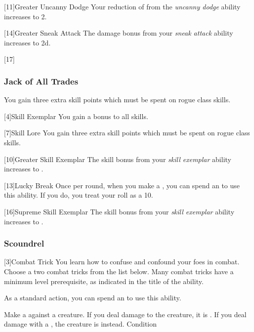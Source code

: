             [11]{Greater Uncanny Dodge}
            Your reduction of  from the \textit{uncanny dodge} ability increases to 2.

            [14]{Greater Sneak Attack}
            The damage bonus from your \textit{sneak attack} ability increases to \plus2d.

            [17]{} 

        \subsubsection{Jack of All Trades}

             You gain three extra skill points which must be spent on rogue class skills.

            [4]{Skill Exemplar} You gain a  bonus to all skills.

            [7]{Skill Lore} You gain three extra skill points which must be spent on rogue class skills.

            [10]{Greater Skill Exemplar} The skill bonus from your \textit{skill exemplar} ability increases to .

            [13]{Lucky Break} Once per round, when you make a , you can spend an  to use this ability.
            If you do, you treat your roll as a 10.

            [16]{Supreme Skill Exemplar} The skill bonus from your \textit{skill exemplar} ability increases to .

        \subsubsection{Scoundrel}

            [3]{Combat Trick}
            You learn how to confuse and confound your foes in combat.
            Choose a two combat tricks from the list below.
            Many combat tricks have a minimum level prerequisite, as indicated in the title of the ability.

             As a standard action, you can spend an  to use this ability.
            \begin{ability}
                \begin{spelleffects}
                    \spelleffect Make a  against a creature.
                    If you deal damage to the creature, it is \disoriented.
                    If you deal damage with a , the creature is \stunned instead.
                    \spelldur Condition
                \end{spelleffects}
            \end{ability}

